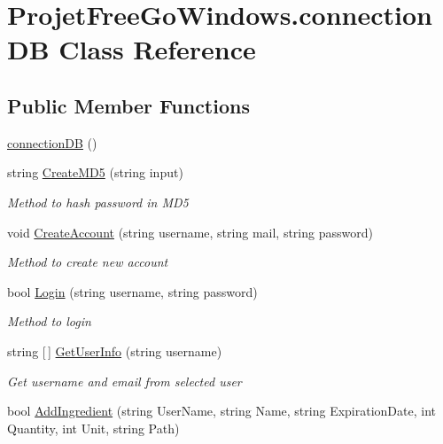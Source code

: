\hypertarget{class_projet_free_go_windows_1_1connection_d_b}{}\section{Projet\+Free\+Go\+Windows.\+connection\+DB Class Reference}
\label{class_projet_free_go_windows_1_1connection_d_b}
\subsection*{Public Member Functions}
\begin{DoxyCompactItemize}
\item 
\hyperlink{class_projet_free_go_windows_1_1connection_d_b_a74e5cd91e5b8a2d76686a461825928b3}{connection\+DB} ()
\item 
string \hyperlink{class_projet_free_go_windows_1_1connection_d_b_a19f270f3ae9bdf72c893ff816c13f07a}{Create\+M\+D5} (string input)
\begin{DoxyCompactList}\small\item\em Method to hash password in M\+D5 \end{DoxyCompactList}\item 
void \hyperlink{class_projet_free_go_windows_1_1connection_d_b_a93b0c9afdcecdf6037914803abb2b98f}{Create\+Account} (string username, string mail, string password)
\begin{DoxyCompactList}\small\item\em Method to create new account \end{DoxyCompactList}\item 
bool \hyperlink{class_projet_free_go_windows_1_1connection_d_b_a0dcd082489031a2cd443b7e384905755}{Login} (string username, string password)
\begin{DoxyCompactList}\small\item\em Method to login \end{DoxyCompactList}\item 
string \mbox{[}$\,$\mbox{]} \hyperlink{class_projet_free_go_windows_1_1connection_d_b_ae017d427bfa452aaaaf4a096a1bdbe36}{Get\+User\+Info} (string username)
\begin{DoxyCompactList}\small\item\em Get username and email from selected user \end{DoxyCompactList}\item 
bool \hyperlink{class_projet_free_go_windows_1_1connection_d_b_a2dfea9efb2c92de8c2bfe25774d31ebb}{Add\+Ingredient} (string User\+Name, string Name, string Expiration\+Date, int Quantity, int Unit, string Path)

\end{DoxyCompactItemize}
